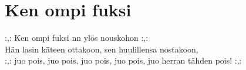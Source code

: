 \section{Ken ompi fuksi}

:,: Ken ompi fuksi nn ylös nouskohon :,:\\
Hän lasin käteen ottakoon, sen huulillensa nostakoon,\\
:,: juo pois, juo pois, juo pois, juo pois, juo herran tähden pois! :,: